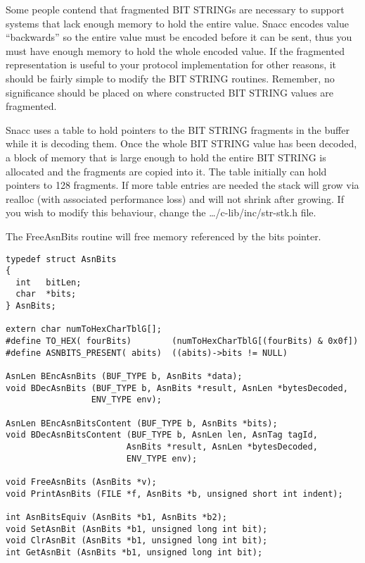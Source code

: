 Some people contend that fragmented BIT STRINGs are necessary to
support systems that lack enough memory to hold the entire value.
Snacc encodes value ``backwards'' so the entire value must be encoded
before it can be sent, thus you must have enough memory to hold the
whole encoded value.  If the fragmented representation is useful to
your protocol implementation for other reasons, it should be fairly
simple to modify the BIT STRING routines.  Remember, no significance
should be placed on where constructed BIT STRING values are fragmented.

Snacc uses a table to hold pointers to the BIT STRING fragments in the
buffer while it is decoding them. Once the whole BIT STRING value has
been decoded, a block of memory that is large enough to hold the
entire BIT STRING is allocated and the fragments are copied into it.
The table initially can hold pointers to 128 fragments.  If more table
entries are needed the stack will grow via {\C realloc} (with
associated performance loss) and will not shrink after growing.  If
you wish to modify this behaviour, change the
{\ufn \dots/c-lib/inc/str-stk.h} file.

The {\C FreeAsnBits} routine will free memory referenced by the
{\C bits} pointer.

\begin{small}
\begin{verbatim}
typedef struct AsnBits
{
  int   bitLen;
  char  *bits;
} AsnBits;

extern char numToHexCharTblG[];
#define TO_HEX( fourBits)        (numToHexCharTblG[(fourBits) & 0x0f])
#define ASNBITS_PRESENT( abits)  ((abits)->bits != NULL)

AsnLen BEncAsnBits (BUF_TYPE b, AsnBits *data);
void BDecAsnBits (BUF_TYPE b, AsnBits *result, AsnLen *bytesDecoded,
                 ENV_TYPE env);

AsnLen BEncAsnBitsContent (BUF_TYPE b, AsnBits *bits);
void BDecAsnBitsContent (BUF_TYPE b, AsnLen len, AsnTag tagId,
                        AsnBits *result, AsnLen *bytesDecoded,
                        ENV_TYPE env);

void FreeAsnBits (AsnBits *v);
void PrintAsnBits (FILE *f, AsnBits *b, unsigned short int indent);

int AsnBitsEquiv (AsnBits *b1, AsnBits *b2);
void SetAsnBit (AsnBits *b1, unsigned long int bit);
void ClrAsnBit (AsnBits *b1, unsigned long int bit);
int GetAsnBit (AsnBits *b1, unsigned long int bit);
\end{verbatim}
\end{small}

